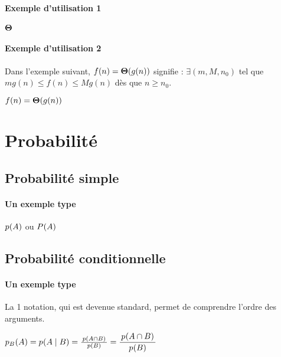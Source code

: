 \documentclass[12pt,a4paper]{article}
\theoremstyle{definition}
\begin{document}
\paragraph{Exemple d'utilisation 1}

\begin{latexex}
$\bigtheta{}$
\end{latexex}




\paragraph{Exemple d'utilisation 2}

Dans l'exemple suivant, $f(n) = \bigtheta{g(n)}$ signifie : $\exists (m, M, n_0)$ tel que $m g(n) \leqslant f(n) \leqslant M g(n)$ dès que $n \geqslant n_0$.

\begin{latexex}
$f(n) = \bigtheta{g(n)}$
\end{latexex}


\section{Probabilité}

\subsection{Probabilité \og simple \fg}

\paragraph{Un exemple type}

\begin{latexex}
$\proba{A}$ ou
$\proba[P]{A}$
\end{latexex}




\subsection{Probabilité conditionnelle}

\paragraph{Un exemple type}

La 1\iere{} notation, qui est devenue standard, permet de comprendre l'ordre des arguments.
\begin{latexex}
$\probacond{B}{A}
 =
 \probacond*{B}{A}
 =
 \probacond**{B}{A}
 =
 \dprobacond**{B}{A}$
\end{latexex}
\end{document}
